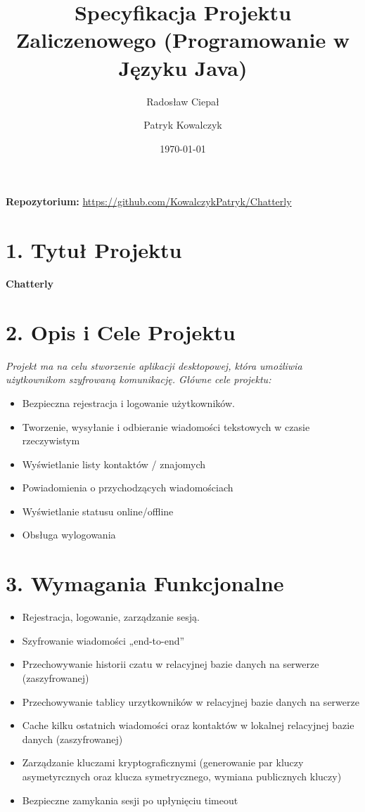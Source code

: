 \documentclass[a4paper,12pt]{article}
\title{Specyfikacja Projektu Zaliczenowego (Programowanie w Języku Java)}
\author{Radosław Ciepał \and Patryk Kowalczyk}
\date{\today}
\begin{document}
\maketitle

\textbf{Repozytorium:} \href{https://github.com/KowalczykPatryk/Chatterly}{https://github.com/KowalczykPatryk/Chatterly}

\section*{1. Tytuł Projektu}

\vspace{0.5 cm}
 \noindent
\textbf{Chatterly}

\section*{2. Opis i Cele Projektu}

\vspace{0.5 cm}
 \noindent

\textit{ Projekt ma na celu stworzenie aplikacji desktopowej, która umożliwia użytkownikom szyfrowaną komunikację. Główne cele projektu:}

\begin{itemize}
    \item Bezpieczna rejestracja i logowanie użytkowników.
    \item Tworzenie, wysyłanie i odbieranie wiadomości tekstowych w czasie rzeczywistym
    \item Wyświetlanie listy kontaktów / znajomych
    \item Powiadomienia o przychodzących wiadomościach
    \item Wyświetlanie statusu online/offline
    \item Obsługa wylogowania
\end{itemize}

\section*{3. Wymagania Funkcjonalne}

\vspace{0.5 cm}
 \noindent

\begin{itemize}
    \item Rejestracja, logowanie, zarządzanie sesją.
    \item Szyfrowanie wiadomości „end-to-end”
    \item Przechowywanie historii czatu w relacyjnej bazie danych na serwerze (zaszyfrowanej)
    \item Przechowywanie tablicy urzytkowników w relacyjnej bazie danych na serwerze
    \item Cache kilku ostatnich wiadomości oraz kontaktów w lokalnej relacyjnej bazie danych (zaszyfrowanej)
    \item Zarządzanie kluczami kryptograficznymi (generowanie par kluczy asymetyrcznych oraz klucza symetrycznego, wymiana publicznych kluczy)
    \item Bezpieczne zamykania sesji po upłynięciu timeout
\end{itemize}
\end{document}

